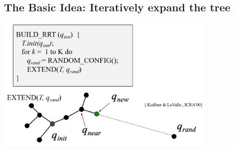 \documentclass[10pt]{article}
\begin{document}
\subsection*{The Basic Idea: Iteratively expand the tree}
\begin{center} 
    \includegraphics*[width=0.8\textwidth]{L1_11.png} 
\end{center}
\end{document}
